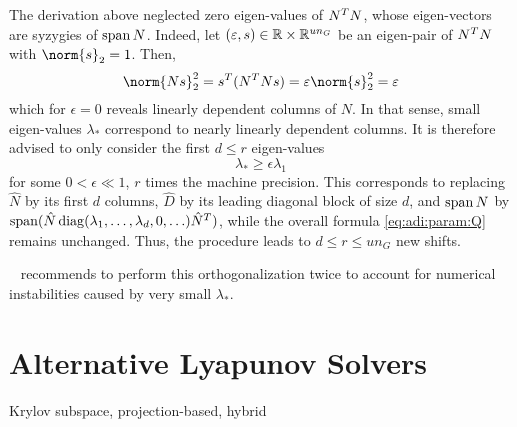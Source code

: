 The derivation above neglected zero eigen-values of $N^T N$,
whose eigen-vectors are syzygies of $\operatorname{span} N$.
Indeed, let $(\varepsilon,s)\in\mathbb{R}\times\mathbb{R}^{un_G}$ be an eigen-pair of $N^T N$ with $\norm{s}_2 = 1$.
Then,
\begin{equation}
  \norm{Ns}_2^2
  = s^\T (N^\T N s)
  = \epsilon\norm{s}_2^2
  = \epsilon
\end{equation}
which for $\epsilon=0$ reveals linearly dependent columns of $N$.
In that sense, small eigen-values $\lambda_*$ correspond to nearly linearly dependent columns.
It is therefore advised to only consider the first $d \leq r$ eigen-values
\begin{equation}
  \lambda_* \geq \epsilon \lambda_1
\end{equation}
for some $0 < \epsilon \ll 1$, \eg $r$ times the machine precision.
This corresponds to replacing
$\hat N$ by its first $d$ columns,
$\hat D$ by its leading diagonal block of size $d$,
and $\operatorname{span} N$ by $\operatorname{span}(\hat N \operatorname{diag}(\lambda_1, \ldots, \lambda_d, 0, \ldots) \hat N^T)$,
while the overall formula \eqref{eq:adi:param:Q} remains unchanged.
Thus, the procedure leads to $d \leq r \leq un_G$ new shifts.

\citeauthor{Kuerschner2016}~\cite{Kuerschner2016} recommends to perform this orthogonalization twice
to account for numerical instabilities caused by very small $\lambda_*$.



\section{Alternative Lyapunov Solvers}
Krylov subspace,
projection-based,
hybrid
